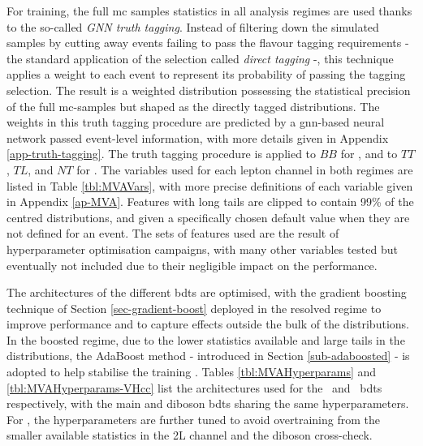 For training, the full \gls{mc} samples statistics in all analysis regimes are used thanks to the so-called \textit{GNN truth tagging}. Instead of filtering down the simulated samples by cutting away events failing to pass the flavour tagging requirements - the standard application of the selection called \textit{direct tagging} -, this technique applies a weight to each event to represent its probability of passing the tagging selection. The result is a weighted distribution possessing the statistical precision of the full \gls{mc}-samples but shaped as the directly tagged distributions. The weights in this truth tagging procedure are predicted by a \gls{gnn}-based neural network passed event-level information, with more details given in Appendix \ref{app-truth-tagging}. The truth tagging procedure is applied to $BB$ for \vhb, and to $TT$, $TL$, and $NT$ for \vhc. The variables used for each lepton channel in both regimes are listed in Table \ref{tbl:MVAVars}, with more precise definitions of each variable given in Appendix \ref{ap-MVA}. Features with long tails are clipped to contain 99\% of the centred distributions, and given a specifically chosen default value when they are not defined for an event. The sets of features used are the result of hyperparameter optimisation campaigns, with many other variables tested but eventually not included due to their negligible impact on the performance. 



The architectures of the different \glspl{bdt} are optimised, with the gradient boosting technique of Section \ref{sec-gradient-boost} deployed in the resolved regime to improve performance and to capture effects outside the bulk of the distributions. In the boosted regime, due to the lower statistics available and large tails in the distributions, the AdaBoost method - introduced in Section \ref{sub-adaboosted} - is adopted to help stabilise the training \cite{Adaboost}. Tables \ref{tbl:MVAHyperparams} and \ref{tbl:MVAHyperparams-VHcc} list the architectures used for the \vhb\ and \vhc\ \glspl{bdt} respectively, with the main and diboson \glspl{bdt} sharing the same hyperparameters. For \vhc, the hyperparameters are further tuned to avoid overtraining from the smaller available statistics in the 2L channel and the diboson cross-check.



